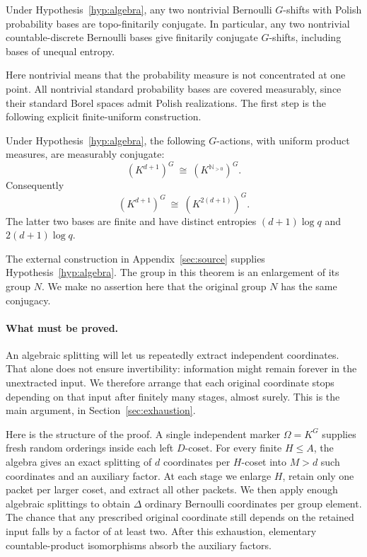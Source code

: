 \documentclass[11pt,a4paper]{article}
\numberwithin{equation}{section}
\newcommand{\NN}{\mathbb N}
\begin{document}
\begin{theorem}\label{thm:all-bases}
Under Hypothesis~\ref{hyp:algebra}, any two nontrivial Bernoulli $G$-shifts
with Polish probability bases are topo-finitarily conjugate. In particular,
any two nontrivial countable-discrete Bernoulli bases give finitarily
conjugate $G$-shifts, including bases of unequal entropy.
\end{theorem}

Here nontrivial means that the probability measure is not concentrated at
one point. All nontrivial standard probability bases are covered
measurably, since their standard Borel spaces admit Polish realizations.
The first step is the following explicit finite-uniform construction.

\begin{theorem}\label{thm:main}
Under Hypothesis~\ref{hyp:algebra}, the following $G$-actions, with uniform
product measures, are measurably conjugate:
\begin{equation}\label{eq:main}
 (K^{d+1})^G\ \cong\ (K^{\NN_{>0}})^G.
\end{equation}
Consequently
\[
 (K^{d+1})^G\ \cong\ (K^{2(d+1)})^G.
\]
The latter two bases are finite and have distinct entropies
$(d+1)\log q$ and $2(d+1)\log q$.
\end{theorem}

The external construction in Appendix~\ref{sec:source} supplies
Hypothesis~\ref{hyp:algebra}. The group in this theorem is an enlargement
of its group $N$. We make no assertion here that the original group $N$
has the same conjugacy.

\paragraph{What must be proved.}
An algebraic splitting will let us repeatedly extract independent
coordinates. That alone does not ensure invertibility: information might
remain forever in the unextracted input. We therefore arrange that each
original coordinate stops depending on that input after finitely many
stages, almost surely. This is the main argument, in
Section~\ref{sec:exhaustion}.

Here is the structure of the proof. A single independent marker
$\Omega=K^G$ supplies fresh random orderings inside each left $D$-coset.
For every finite $H\leq A$, the algebra gives an exact splitting of $d$
coordinates per $H$-coset into $M>d$ such coordinates and an auxiliary
factor. At each stage we enlarge $H$, retain only one packet per larger
coset, and extract all other packets. We then apply enough algebraic
splittings to obtain $\Delta$ ordinary Bernoulli coordinates per group
element. The chance that any prescribed original coordinate still depends
on the retained input falls by a factor of at least two. After this
exhaustion, elementary countable-product isomorphisms absorb the auxiliary
factors.
\end{document}
